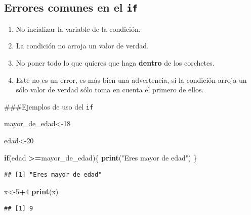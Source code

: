 \documentclass[
]{book}
\newenvironment{Shaded}{\begin{snugshade}}{\end{snugshade}}
\newcommand{\ControlFlowTok}[1]{\textcolor[rgb]{0.13,0.29,0.53}{\textbf{#1}}}
\newcommand{\DecValTok}[1]{\textcolor[rgb]{0.00,0.00,0.81}{#1}}
\newcommand{\FunctionTok}[1]{\textcolor[rgb]{0.13,0.29,0.53}{\textbf{#1}}}
\newcommand{\NormalTok}[1]{#1}
\newcommand{\OtherTok}[1]{\textcolor[rgb]{0.56,0.35,0.01}{#1}}
\newcommand{\SpecialCharTok}[1]{\textcolor[rgb]{0.81,0.36,0.00}{\textbf{#1}}}
\newcommand{\StringTok}[1]{\textcolor[rgb]{0.31,0.60,0.02}{#1}}
\providecommand{\tightlist}{%
  \setlength{\itemsep}{0pt}\setlength{\parskip}{0pt}}
\begin{document}
\subsection{\texorpdfstring{Errores comunes en el \texttt{if}}{Errores comunes en el if}}\label{errores-comunes-en-el-if}

\begin{enumerate}
\def\labelenumi{\arabic{enumi}.}
\tightlist
\item
  No incializar la variable de la condición.
\item
  La condición no arroja un valor de verdad.
\item
  No poner todo lo que quieres que haga \textbf{dentro} de los corchetes.
\item
  Este no es un error, es más bien una advertencia, si la condición arroja un sólo valor de verdad sólo toma en cuenta el primero de ellos.
\end{enumerate}

\#\#\#Ejemplos de uso del \texttt{if}

\begin{Shaded}
\begin{Highlighting}[]
\NormalTok{mayor\_de\_edad}\OtherTok{\textless{}{-}}\DecValTok{18}

\NormalTok{edad}\OtherTok{\textless{}{-}}\DecValTok{20}

\ControlFlowTok{if}\NormalTok{(edad }\SpecialCharTok{\textgreater{}=}\NormalTok{mayor\_de\_edad)\{}
  \FunctionTok{print}\NormalTok{(}\StringTok{"Eres mayor de edad"}\NormalTok{)}
\NormalTok{\}}
\end{Highlighting}
\end{Shaded}

\begin{verbatim}
## [1] "Eres mayor de edad"
\end{verbatim}

\begin{Shaded}
\begin{Highlighting}[]
\NormalTok{x}\OtherTok{\textless{}{-}}\DecValTok{5}\SpecialCharTok{+}\DecValTok{4}
\FunctionTok{print}\NormalTok{(x)}
\end{Highlighting}
\end{Shaded}

\begin{verbatim}
## [1] 9
\end{verbatim}
\end{document}
